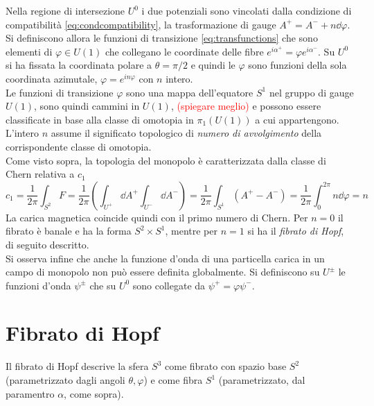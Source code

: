 Nella regione di intersezione $U^0$ i due potenziali sono vincolati dalla condizione
di compatibilità \ref{eq:condcompatibility}, la trasformazione di gauge
$A^+ = A^- + n \dd  \varphi $. Si definiscono allora le funzioni di transizione
\ref{eq:transfunctions}
che sono elementi di $\varphi  \in U(1)$ che collegano le coordinate delle fibre
$e^{i\alpha^+} = \varphi  e^{i\alpha^-}$. Su $U^0$ si ha fissata la coordinata polare
a $\theta = \pi/2$ e quindi le $\varphi $ sono funzioni della sola coordinata azimutale,
$ \varphi  = e^{in\varphi }$ con $n$ intero.\\

Le funzioni di transizione $\varphi $ sono una mappa dell'equatore $S^1$ nel gruppo
di gauge $U(1)$, sono quindi cammini in $U(1)$,
\textcolor{red}{(spiegare meglio)}
e possono essere
classificate in base alla classe di omotopia in $\pi_1(U(1))$ a cui appartengono.
L'intero $n$ assume il significato topologico di \emph{numero di avvolgimento}
della corrispondente classe di omotopia.\\

Come visto sopra, la topologia del monopolo è caratterizzata dalla classe di Chern
relativa a $c_1$
\begin{equation*}
      c_1   = \frac{1}{2\pi} \int_{S^2} F
            = \frac{1}{2\pi} \left( \int_{U^+} \dd A^+ \int_{U^-} \dd A^- \right)
            = \frac{1}{2\pi} \int_{S^1} (A^+-A^-)
            = \frac{1}{2\pi} \int_0^{2\pi} n\dd \varphi   = n
\end{equation*}
La carica magnetica coincide quindi con il primo numero di Chern. Per $n=0$ il
fibrato è banale e ha la forma $S^2 \times S^1$, mentre per $n=1$ si ha il
\emph{fibrato di Hopf}, di seguito descritto.\\

Si osserva infine che anche la funzione d'onda di una particella carica in un
campo di monopolo non può essere definita globalmente.
Si definiscono su $U^\pm$ le funzioni d'onda $\psi^\pm$ che su $U^0$ sono collegate
da $\psi^+ = \varphi  \psi^-$.
\section{Fibrato di Hopf}
Il fibrato di Hopf descrive la sfera $S^3$ come fibrato con spazio
base $S^2$ (parametrizzato dagli angoli $\theta,\varphi $) e come fibra $S^1$ (parametrizzato,
dal paramentro $\alpha$, come sopra).\\

